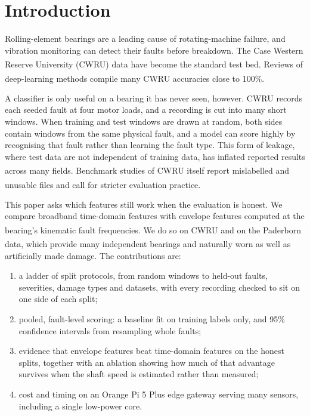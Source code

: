 \documentclass[conference,letterpaper]{IEEEtran}
\newcommand{\scite}[1]{\textsuperscript{\cite{#1}}}
\begin{document}
\section{Introduction}

Rolling-element bearings are a leading cause of rotating-machine failure, and vibration monitoring can detect
their faults before breakdown. The Case Western Reserve University (CWRU) data\scite{cwru} have become the
standard test bed. Reviews of deep-learning methods compile many CWRU accuracies close to
100\%\scite{zhang2020,neupane2020}.

A classifier is only useful on a bearing it has never seen, however. CWRU records each seeded fault at four motor
loads, and a recording is cut into many short windows. When training and test windows are drawn at random, both
sides contain windows from the same physical fault, and a model can score highly by recognising that fault rather
than learning the fault type. This form of leakage, where test data are not independent of training data, has
inflated reported results across many fields\scite{kapoor2023}. Benchmark studies of CWRU itself report mislabelled
and unusable files and call for stricter evaluation practice\scite{smith2015,hendriks2022}.

This paper asks which features still work when the evaluation is honest. We compare broadband time-domain
features with envelope features computed at the bearing's kinematic fault frequencies\scite{randall2011}. We do so
on CWRU and on the Paderborn data\scite{lessmeier2016}, which provide many independent bearings and naturally
worn as well as artificially made damage. The contributions are:
\begin{enumerate}
\item a ladder of split protocols, from random windows to held-out faults, severities, damage types and datasets,
with every recording checked to sit on one side of each split;
\item pooled, fault-level scoring: a baseline fit on training labels only, and 95\% confidence intervals from
resampling whole faults;
\item evidence that envelope features beat time-domain features on the honest splits, together with an
ablation showing how much of that advantage survives when the shaft speed is estimated rather than measured;
\item cost and timing on an Orange Pi 5 Plus edge gateway serving many sensors, including a single low-power core.
\end{enumerate}
\end{document}
